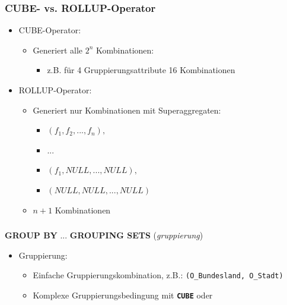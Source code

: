     \begin{frame}
    
    \frametitle{CUBE- vs. ROLLUP-Operator}
    
    
    \begin{itemize}
    \item CUBE-Operator:
      \begin{itemize}
      \item Generiert alle $2^n$ Kombinationen:
        \begin{itemize}
        \item z.B. für 4 Gruppierungsattribute 16 Kombinationen
        \end{itemize}
      \end{itemize}
    \item ROLLUP-Operator:
      \begin{itemize}
      \item Generiert nur Kombinationen mit Superaggregaten:
        \begin{itemize}
        \item $(f_1, f_2, ..., f_n),$
        \item $ ...$
        \item $(f_1, NULL, ..., NULL),$
        \item $(NULL, NULL, ..., NULL)$
        \end{itemize}
      \item $n+1$ Kombinationen
      \end{itemize}
    \end{itemize}
    
    \end{frame}
    
    
    \begin{frame}
    
    \frametitle{}
    
    \begin{sql}
        \textbf{GROUP BY} ... \textbf{GROUPING SETS}
        (\textit{gruppierung})
      \end{sql}
    
      \begin{itemize}
    \item Gruppierung:
      \begin{itemize}
      \item Einfache Gruppierungskombination, z.B.: \texttt{(O\_Bundesland,
         O\_Stadt)}
      \item Komplexe Gruppierungsbedingung mit \textbf{\texttt{CUBE}} oder
      \end{itemize}
    \end{itemize}
    
    
    \end{frame}
    
